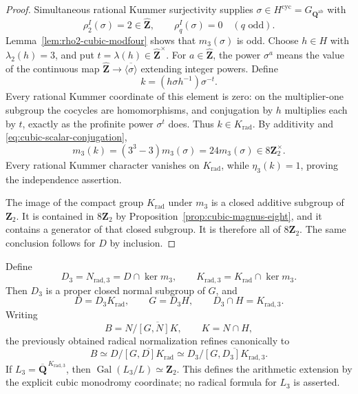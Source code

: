 \begin{proof}
Simultaneous rational Kummer surjectivity supplies
$\sigma\in H^{\mathrm{cyc}}=G_{\mathbf Q^{\mathrm{ab}}}$ with
\[
 \rho_2^I(\sigma)=2\in\widehat{\mathbf Z},\qquad
 \rho_q^I(\sigma)=0\quad(q\text{ odd}).
\]
Lemma~\ref{lem:rho2-cubic-modfour} shows that $m_3(\sigma)$ is odd.
Choose $h\in H$ with $\lambda_2(h)=3$, and put
$t=\lambda(h)\in\widehat{\mathbf Z}^{\times}$.  For
$a\in\widehat{\mathbf Z}$, the power $\sigma^a$ means the value of
the continuous map $\widehat{\mathbf Z}\to
\overline{\langle\sigma\rangle}$ extending integer powers.
Define
\[
 k=(h\sigma h^{-1})\sigma^{-t}.
\]
Every rational Kummer coordinate of this element is zero:
on the multiplier-one subgroup the cocycles are homomorphisms,
and conjugation by $h$ multiplies each by $t$, exactly as the
profinite power $\sigma^t$ does.  Thus $k\in K_{\mathrm{rad}}$.
By additivity and \eqref{eq:cubic-scalar-conjugation},
\[
 m_3(k)=(3^3-3)m_3(\sigma)
        =24m_3(\sigma)\in8\mathbf Z_2^\times.
\]
Every rational Kummer character vanishes on $K_{\mathrm{rad}}$, while
$\eta_3(k)=1$, proving the independence assertion.

The image of the compact group $K_{\mathrm{rad}}$ under $m_3$ is a
closed additive subgroup of $\mathbf Z_2$.  It is contained in
$8\mathbf Z_2$ by Proposition~\ref{prop:cubic-magnus-eight}, and it
contains a generator of that closed subgroup.  It is therefore all of
$8\mathbf Z_2$.  The same conclusion follows for $D$ by inclusion.
\end{proof}

\begin{corollary}
\label{cor:cubic-radical-normalization}
Define
\[
 D_3=N_{\mathrm{rad},3}=D\cap\ker m_3,
 \qquad K_{\mathrm{rad},3}=K_{\mathrm{rad}}\cap\ker m_3.
\]
Then $D_3$ is a proper closed normal subgroup of $G$, and
\[
 D=D_3K_{\mathrm{rad}},\qquad
 G=D_3H,\qquad D_3\cap H=K_{\mathrm{rad},3}.
\]
Writing
\[
 B=N/\overline{[G,N]K},\qquad K=N\cap H,
\]
the previously obtained radical normalization refines canonically to
\[
 B\simeq
 D/\overline{[G,D]K_{\mathrm{rad}}}
 \simeq
 D_3/\overline{[G,D_3]K_{\mathrm{rad},3}}.
\]
If $L_3=\overline{\mathbf Q}^{\,K_{\mathrm{rad},3}}$, then
$\operatorname{Gal}(L_3/L)\simeq\mathbf Z_2$.  This defines the
arithmetic extension by the explicit cubic monodromy coordinate; no
radical formula for $L_3$ is asserted.
\end{corollary}

